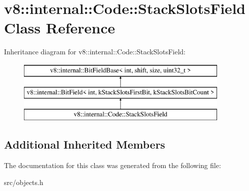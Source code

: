 \hypertarget{classv8_1_1internal_1_1_code_1_1_stack_slots_field}{}\section{v8\+:\+:internal\+:\+:Code\+:\+:Stack\+Slots\+Field Class Reference}
\label{classv8_1_1internal_1_1_code_1_1_stack_slots_field}
Inheritance diagram for v8\+:\+:internal\+:\+:Code\+:\+:Stack\+Slots\+Field\+:\begin{figure}[H]
\begin{center}
\leavevmode
\includegraphics[height=3.000000cm]{classv8_1_1internal_1_1_code_1_1_stack_slots_field}
\end{center}
\end{figure}
\subsection*{Additional Inherited Members}


The documentation for this class was generated from the following file\+:\begin{DoxyCompactItemize}
\item 
src/objects.\+h\end{DoxyCompactItemize}
